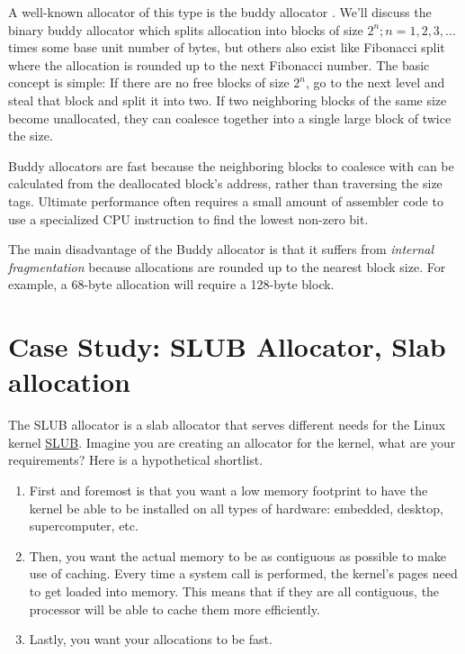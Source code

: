 A well-known allocator of this type is the buddy allocator \cite[P. 85]{rangan1999foundations}.
We'll discuss the binary buddy allocator which splits allocation into blocks of size $2^n; n = 1, 2, 3, ...$ times some base unit number of bytes, but others also exist like Fibonacci split where the allocation is rounded up to the next Fibonacci number.
The basic concept is simple: If there are no free blocks of size $2^n$, go to the next level and steal that block and split it into two.
If two neighboring blocks of the same size become unallocated, they can coalesce together into a single large block of twice the size.

Buddy allocators are fast because the neighboring blocks to coalesce with can be calculated from the deallocated block's address, rather than traversing the size tags.
Ultimate performance often requires a small amount of assembler code to use a specialized CPU instruction to find the lowest non-zero bit.

The main disadvantage of the Buddy allocator is that it suffers from \emph{internal fragmentation} because allocations are rounded up to the nearest block size.
For example, a 68-byte allocation will require a 128-byte block.

\section{Case Study: SLUB Allocator, Slab allocation}

The SLUB allocator is a slab allocator that serves different needs for the Linux kernel \href{http://en.wikipedia.org/wiki/SLUB_\%28software\%29}{SLUB}.
Imagine you are creating an allocator for the kernel, what are your requirements?
Here is a hypothetical shortlist.

\begin{enumerate}
\item First and foremost is that you want a low memory footprint to have the kernel be able to be installed on all types of hardware: embedded, desktop, supercomputer, etc.
\item Then, you want the actual memory to be as contiguous as possible to make use of caching. Every time a system call is performed, the kernel's pages need to get loaded into memory. This means that if they are all contiguous, the processor will be able to cache them more efficiently.
\item Lastly, you want your allocations to be fast.
\end{enumerate}

